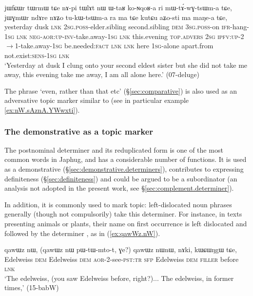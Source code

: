 \begin{exe}
\ex \label{ex:jWGmWr.ndAre}
\gll jɯfɕɯr tɯrmɯ tɕe nɤ-pi tɯlɤt nɯ ɯ-taʁ ko-ɴqoʁ-a ri mɯ-tɤ́-wɣ-tsɯm-a tɕe,
jɯɣmɯr ndɤre nɤʑo tu-kɯ-tsɯm-a ra ma tɕe kutɕu aʑo-sti ma maŋe-a tɕe, \\
 yesterday dusk \textsc{lnk} \textsc{2sg}.\textsc{poss}-elder.sibling  second.sibling \textsc{dem} \textsc{3sg}.\textsc{poss}-on \textsc{ifr}-hang-\textsc{1sg} \textsc{lnk} \textsc{neg}-\textsc{aor}:\textsc{up}-\textsc{inv}-take.away-\textsc{1sg} \textsc{lnk} this.evening \textsc{top}.\textsc{advers}  \textsc{2sg} \textsc{ipfv}:\textsc{up}-2$\rightarrow$1-take.away-\textsc{1sg} be.needed:\textsc{fact} \textsc{lnk} \textsc{lnk} here \textsc{1sg}-alone apart.from  not.exist:\textsc{sens}-\textsc{1sg} \textsc{lnk}  \\
\glt  `Yesterday at dusk I clung onto your second eldest sister but she did not take me away, this evening take me away, I am all alone here.' (07-deluge) 
\end{exe}

The phrase  `even, rather than that etc' (§\ref{sec:comparative}) is also used as an adversative topic marker similar to  (see in particular example \ref{ex:nW.sAznA.YWwxti}).

\subsubsection{The demonstrative  as a topic marker} \label{sec:nW.topic}
  
The postnominal determiner  and its reduplicated form  is one of the most common words in Japhug, and has a considerable number of functions. It is used as a demonstrative (§\ref{sec:demonstrative.determiners}), contributes to expressing definiteness (§\ref{sec:definiteness}) and could be argued to be a subordinator (an analysis not adopted in the present work, see §\ref{sec:complement.determiner}).

In addition, it is commonly used to mark topic: left-dislocated noun phrases generally (though not compulsorily) take this determiner. For instance, in texts presenting animals or plants, their name on first occurrence is left dislocated and followed by the determiner , as in (\ref{ex:qawWz.nW}).

\begin{exe}
\ex \label{ex:qawWz.nW}
\gll  qawɯz nɯ, (qawɯz nɯ pɯ-tɯ-mto-t, ɣe?)  qawɯz nɯnɯ, nɤki, kɯɕɯŋgɯ tɕe, \\
Edelweiss \textsc{dem} Edelweiss \textsc{dem} \textsc{aor}-2-see-\textsc{pst}:\textsc{tr} \textsc{sfp} Edelweiss \textsc{dem} \textsc{filler} before \textsc{lnk} \\
\glt `The edelweiss, (you saw Edelweiss before, right?)... The edelweiss, in former times,' (15-babW) 
\end{exe}

